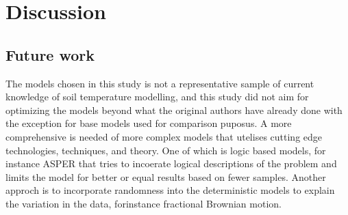 \section{Discussion}

\subsection{Future work}

The models chosen in this study is not a representative sample of current knowledge of soil temperature modelling, and this study did not aim for optimizing the models beyond what the original authors have already done with the exception for base models used for comparison puposus. A more comprehensive is needed of more complex models that utelises cutting edge technologies, techniques, and theory. One of which is logic based models, for instance ASPER\cite{le_asper_2023} that tries to incoerate logical descriptions of the problem and limits the model for better or equal results based on fewer samples\cite{machot_bridging_2023}. Another approch is to incorporate randomness into the deterministic models to explain the variation in the data, forinstance fractional Brownian motion\cite{di_crescenzo_model_2022}.